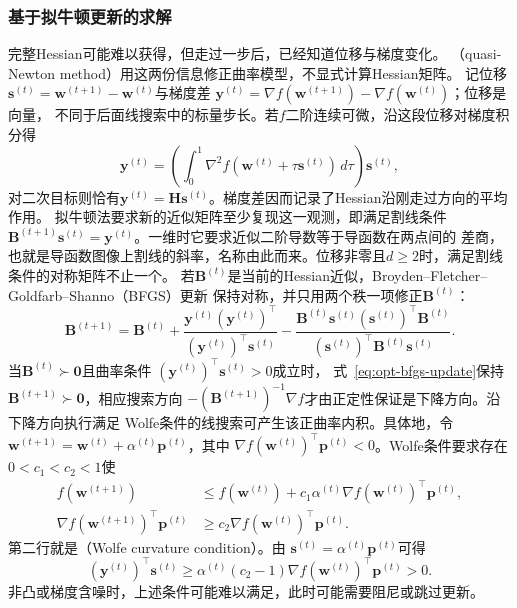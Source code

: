 \subsubsection{基于拟牛顿更新的求解}
\label{sec:opt-quasi-newton}

完整Hessian可能难以获得，但走过一步后，已经知道位移与梯度变化。
（quasi-Newton method）用这两份信息修正曲率模型，不显式计算Hessian矩阵。
记位移$\bm{s}^{(t)}=\bm{w}^{(t+1)}-\bm{w}^{(t)}$与梯度差
$\bm{y}^{(t)}=\nabla f(\bm{w}^{(t+1)})-\nabla f(\bm{w}^{(t)})$；位移是向量，
不同于后面线搜索中的标量步长。若$f$二阶连续可微，沿这段位移对梯度积分得
\[
 \bm y^{(t)}=\left(\int_0^1\nabla^2f(\bm w^{(t)}+\tau\bm s^{(t)})\,d\tau\right)\bm s^{(t)},
\]
对二次目标则恰有$\bm y^{(t)}=\bm H\bm s^{(t)}$。梯度差因而记录了Hessian沿刚走过方向的平均作用。
拟牛顿法要求新的近似矩阵至少复现这一观测，即满足割线条件
$\bm{B}^{(t+1)}\bm{s}^{(t)}=\bm{y}^{(t)}$。一维时它要求近似二阶导数等于导函数在两点间的
差商，也就是导函数图像上割线的斜率，名称由此而来。位移非零且$d\geq2$时，满足割线条件的对称矩阵不止一个。
若$\bm{B}^{(t)}$是当前的Hessian近似，Broyden--Fletcher--Goldfarb--Shanno（BFGS）更新
保持对称，并只用两个秩一项修正$\bm B^{(t)}$：
\begin{equation}
  \bm{B}^{(t+1)}
  =
  \bm{B}^{(t)}
  +
  \frac{\bm{y}^{(t)}(\bm{y}^{(t)})^{\top}}
       {(\bm{y}^{(t)})^{\top}\bm{s}^{(t)}}
  -
  \frac{\bm{B}^{(t)}\bm{s}^{(t)}(\bm{s}^{(t)})^{\top}\bm{B}^{(t)}}
       {(\bm{s}^{(t)})^{\top}\bm{B}^{(t)}\bm{s}^{(t)}}.
  \label{eq:opt-bfgs-update}
\end{equation}
当$\bm{B}^{(t)}\succ\bm{0}$且曲率条件
$(\bm{y}^{(t)})^{\top}\bm{s}^{(t)}>0$成立时，
式~\eqref{eq:opt-bfgs-update}保持$\bm{B}^{(t+1)}\succ\bm{0}$，相应搜索方向
$-(\bm{B}^{(t+1)})^{-1}\nabla f$才由正定性保证是下降方向。沿下降方向执行满足
Wolfe条件的线搜索可产生该正曲率内积。具体地，令
$\bm{w}^{(t+1)}=\bm{w}^{(t)}+\alpha^{(t)}\bm{p}^{(t)}$，其中
$\nabla f(\bm{w}^{(t)})^{\top}\bm{p}^{(t)}<0$。Wolfe条件要求存在
$0<c_1<c_2<1$使
\begin{equation}
\begin{aligned}
  f(\bm{w}^{(t+1)})
  &\leq
  f(\bm{w}^{(t)})
  +
  c_1\alpha^{(t)}
  \nabla f(\bm{w}^{(t)})^{\top}\bm{p}^{(t)},\\
  \nabla f(\bm{w}^{(t+1)})^{\top}\bm{p}^{(t)}
  &\geq
  c_2\nabla f(\bm{w}^{(t)})^{\top}\bm{p}^{(t)}.
\end{aligned}
\label{eq:opt-wolfe-conditions}
\end{equation}
第二行就是（Wolfe curvature condition）。由
$\bm{s}^{(t)}=\alpha^{(t)}\bm{p}^{(t)}$可得
\[
  (\bm{y}^{(t)})^{\top}\bm{s}^{(t)}
  \geq
  \alpha^{(t)}(c_2-1)
  \nabla f(\bm{w}^{(t)})^{\top}\bm{p}^{(t)}
  >0.
\]
非凸或梯度含噪时，上述条件可能难以满足，此时可能需要阻尼或跳过更新。

